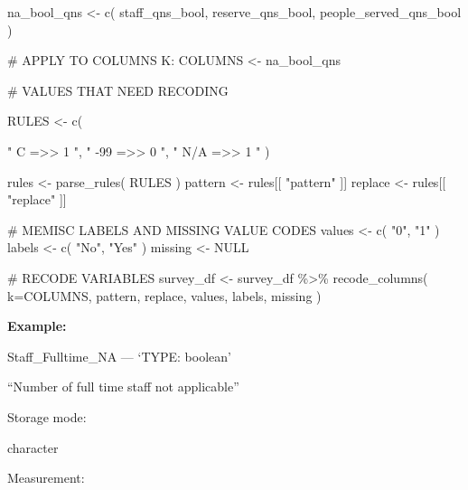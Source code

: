 \documentclass[
  letterpaper,
]{scrbook}
\newenvironment{Shaded}{\begin{snugshade}}{\end{snugshade}}
\newcommand{\AttributeTok}[1]{\textcolor[rgb]{0.40,0.45,0.13}{#1}}
\newcommand{\CommentTok}[1]{\textcolor[rgb]{0.37,0.37,0.37}{#1}}
\newcommand{\ConstantTok}[1]{\textcolor[rgb]{0.56,0.35,0.01}{#1}}
\newcommand{\FunctionTok}[1]{\textcolor[rgb]{0.28,0.35,0.67}{#1}}
\newcommand{\NormalTok}[1]{\textcolor[rgb]{0.00,0.23,0.31}{#1}}
\newcommand{\OtherTok}[1]{\textcolor[rgb]{0.00,0.23,0.31}{#1}}
\newcommand{\SpecialCharTok}[1]{\textcolor[rgb]{0.37,0.37,0.37}{#1}}
\newcommand{\StringTok}[1]{\textcolor[rgb]{0.13,0.47,0.30}{#1}}
\begin{document}
\begin{Shaded}
\begin{Highlighting}[]
\NormalTok{na\_bool\_qns }\OtherTok{\textless{}{-}} 
  \FunctionTok{c}\NormalTok{( staff\_qns\_bool, }
\NormalTok{     reserve\_qns\_bool, }
\NormalTok{     people\_served\_qns\_bool )}


\CommentTok{\# APPLY TO COLUMNS K:}
\NormalTok{COLUMNS }\OtherTok{\textless{}{-}}\NormalTok{  na\_bool\_qns}

\CommentTok{\# VALUES THAT NEED RECODING}

\NormalTok{RULES }\OtherTok{\textless{}{-}} \FunctionTok{c}\NormalTok{(    }
          
             \StringTok{"    C    =\textgreater{}\textgreater{}     1   "}\NormalTok{, }
             \StringTok{"  {-}99    =\textgreater{}\textgreater{}     0   "}\NormalTok{, }
             \StringTok{"  N/A    =\textgreater{}\textgreater{}     1   "}\NormalTok{     )}


\NormalTok{rules }\OtherTok{\textless{}{-}} \FunctionTok{parse\_rules}\NormalTok{( RULES )          }
\NormalTok{pattern }\OtherTok{\textless{}{-}}\NormalTok{ rules[[ }\StringTok{"pattern"}\NormalTok{ ]]}
\NormalTok{replace }\OtherTok{\textless{}{-}}\NormalTok{ rules[[ }\StringTok{"replace"}\NormalTok{ ]]}

\CommentTok{\# MEMISC LABELS AND MISSING VALUE CODES }
\NormalTok{values  }\OtherTok{\textless{}{-}} \FunctionTok{c}\NormalTok{( }\StringTok{"0"}\NormalTok{, }\StringTok{"1"}\NormalTok{ )}
\NormalTok{labels  }\OtherTok{\textless{}{-}} \FunctionTok{c}\NormalTok{( }\StringTok{"No"}\NormalTok{, }\StringTok{"Yes"}\NormalTok{ )}
\NormalTok{missing }\OtherTok{\textless{}{-}} \ConstantTok{NULL}

\CommentTok{\# RECODE VARIABLES }
\NormalTok{survey\_df }\OtherTok{\textless{}{-}} 
\NormalTok{  survey\_df }\SpecialCharTok{\%\textgreater{}\%} 
  \FunctionTok{recode\_columns}\NormalTok{( }\AttributeTok{k=}\NormalTok{COLUMNS, pattern, replace, values, labels, missing )}
\end{Highlighting}
\end{Shaded}

\textbf{Example:}

Staff\_Fulltime\_NA --- {`TYPE: boolean'}

``Number of full time staff not applicable''

Storage mode:

character

Measurement:
\end{document}
